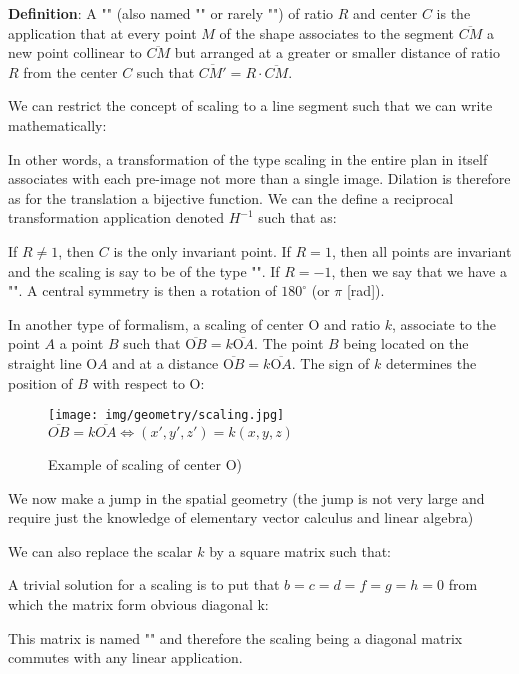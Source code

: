 	\textbf{Definition}:  A "" (also named "" or rarely "") of ratio $R$ and center $C$ is the application that at every point $M$ of the shape associates to the segment $\overline{CM}$ a new point collinear to $\overline{CM}$ but arranged at a greater or smaller distance of ratio $R$ from the center $C$ such that $\overline{CM'}=R\cdot \overline{CM}$.

	We can restrict the concept of scaling to a line segment such that we can write mathematically:
	
	In other words, a transformation of the type scaling in the entire plan in itself associates with each pre-image not more than a single image. Dilation is therefore as for the translation a bijective function. We can the define a reciprocal transformation application denoted $H^{-1}$ such that as:
	
	If $R\neq 1$, then $C$ is the only invariant point. If $R=1$, then all points are invariant and the scaling is say to be of the type "". If $R=-1$, then we say that we have a "". A central symmetry is then a rotation of $180^\circ$ (or $\pi$ [rad]).
	
	In another type of formalism, a scaling of center O and ratio $k$, associate to the point $A$ a point $B$ such that $\overline{\text{O}B}=k\overline{\text{O}A}$. The point $B$ being located on the straight line $\text{O}A$ and at a distance $\overline{\text{O}B}=k\overline{\text{O}A}$. The sign of $k$ determines the position of $B$ with respect to O:
	\begin{figure}[H]
		\centering
		\texttt{[image: img/geometry/scaling.jpg]}\\
		$\overline{OB}=k\overline{OA}\Leftrightarrow (x',y',z')=k(x,y,z)$
		\caption{Example of scaling of center O)}
	\end{figure}
	We now make a jump in the spatial geometry (the jump is not very large and require just the knowledge of elementary vector calculus and linear algebra)

	We can also replace the scalar $k$ by a square matrix such that:
	
	A trivial solution for a scaling is to put that $b=c=d=f=g=h=0$ from which the matrix form obvious diagonal k:
	
	This matrix is named "" and therefore the scaling being a diagonal matrix commutes with any linear application.
	
